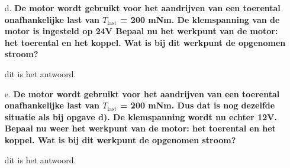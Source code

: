 \begin{enumerate}
    \item [d.] \textbf{De motor wordt gebruikt voor het aandrijven van een toerental onafhankelijke
    last van $T_{\text{last}}$ = 200 mNm. De klemspanning van de motor is ingesteld op 24V
    Bepaal nu het werkpunt van de motor: het toerental en het koppel. Wat is bij dit werkpunt de opgenomen stroom?} 

        dit is het antwoord.

    \item [e.] \textbf{De motor wordt gebruikt voor het aandrijven van een toerental onafhankelijke
    last van $T_{\text{last}}$ = 200 mNm. Dus dat is nog dezelfde situatie als bij opgave d).
    De klemspanning wordt nu echter 12V.
    Bepaal nu weer het werkpunt van de motor: het toerental en het koppel.
    Wat is bij dit werkpunt de opgenomen stroom?}

        dit is het antwoord.

\end{enumerate}
